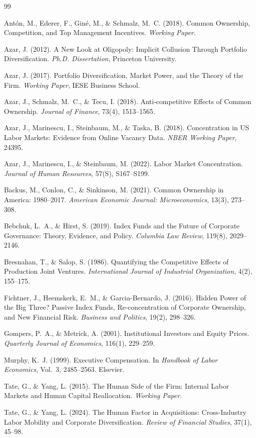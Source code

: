 \documentclass[11pt,a4paper]{article}
\begin{document}
\begin{thebibliography}{99}

Ant\'{o}n, M., Ederer, F., Gin\'{e}, M., \& Schmalz, M.~C. (2018).
Common Ownership, Competition, and Top Management Incentives.
\textit{Working Paper}.

Azar, J. (2012).
A New Look at Oligopoly: Implicit Collusion Through Portfolio Diversification.
\textit{Ph.D. Dissertation}, Princeton University.

Azar, J. (2017).
Portfolio Diversification, Market Power, and the Theory of the Firm.
\textit{Working Paper}, IESE Business School.

Azar, J., Schmalz, M.~C., \& Tecu, I. (2018).
Anti-competitive Effects of Common Ownership.
\textit{Journal of Finance}, 73(4), 1513--1565.

Azar, J., Marinescu, I., Steinbaum, M., \& Taska, B. (2018).
Concentration in US Labor Markets: Evidence from Online Vacancy Data.
\textit{NBER Working Paper}, 24395.

Azar, J., Marinescu, I., \& Steinbaum, M. (2022).
Labor Market Concentration.
\textit{Journal of Human Resources}, 57(S), S167--S199.

Backus, M., Conlon, C., \& Sinkinson, M. (2021).
Common Ownership in America: 1980--2017.
\textit{American Economic Journal: Microeconomics}, 13(3), 273--308.

Bebchuk, L.~A., \& Hirst, S. (2019).
Index Funds and the Future of Corporate Governance: Theory, Evidence, and Policy.
\textit{Columbia Law Review}, 119(8), 2029--2146.

Bresnahan, T., \& Salop, S. (1986).
Quantifying the Competitive Effects of Production Joint Ventures.
\textit{International Journal of Industrial Organization}, 4(2), 155--175.

Fichtner, J., Heemskerk, E.~M., \& Garcia-Bernardo, J. (2016).
Hidden Power of the Big Three? Passive Index Funds, Re-concentration of Corporate Ownership, and New Financial Risk.
\textit{Business and Politics}, 19(2), 298--326.

Gompers, P.~A., \& Metrick, A. (2001).
Institutional Investors and Equity Prices.
\textit{Quarterly Journal of Economics}, 116(1), 229--259.

Murphy, K.~J. (1999).
Executive Compensation.
In \textit{Handbook of Labor Economics}, Vol.~3, 2485--2563. Elsevier.

Tate, G., \& Yang, L. (2015).
The Human Side of the Firm: Internal Labor Markets and Human Capital Reallocation.
\textit{Working Paper}.

Tate, G., \& Yang, L. (2024).
The Human Factor in Acquisitions: Cross-Industry Labor Mobility and Corporate Diversification.
\textit{Review of Financial Studies}, 37(1), 45--98.

\end{thebibliography}
\end{document}
